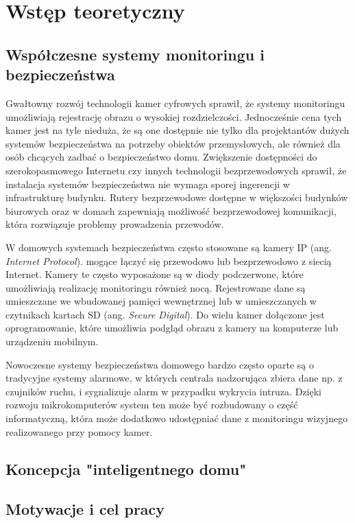 \documentclass[a4paper,11pt,twoside]{article}
\begin{document}
\tableofcontents
\setcounter{tocdepth}{2}
\newpage

\section{Wstęp teoretyczny}

\subsection{Współczesne systemy monitoringu i bezpieczeństwa}
Gwałtowny rozwój technologii kamer cyfrowych sprawił, że systemy monitoringu umożliwiają rejestrację obrazu o wysokiej rozdzielczości. Jednocześnie cena tych kamer jest na tyle nieduża, że są one dostępnie nie tylko dla projektantów dużych systemów bezpieczeństwa na potrzeby obiektów przemysłowych, ale również dla osób chcących zadbać o bezpieczeństwo domu. Zwiększenie dostępności do szerokopasmowego Internetu czy innych technologii bezprzewodowych sprawił, że  instalacja systemów bezpieczeństwa nie wymaga sporej ingerencji w infrastrukturę budynku. Rutery bezprzewodowe dostępne w większości budynków biurowych oraz w domach zapewniają możliwość bezprzewodowej komunikacji, która rozwiązuje problemy prowadzenia przewodów.

W domowych systemach bezpieczeństwa często stosowane są kamery IP (ang. \textit{Internet Protocol}). mogące łączyć się przewodowo lub bezprzewodowo z siecią Internet. Kamery te często wyposażone są w diody podczerwone, które umożliwiają realizację monitoringu również nocą. Rejestrowane dane są umieszczane we wbudowanej pamięci wewnętrznej lub w umieszczanych w czytnikach kartach SD (ang. \textit{Secure Digital}). Do wielu kamer dołączone jest oprogramowanie, które umożliwia podgląd obrazu z kamery na komputerze lub urządzeniu mobilnym.

Nowoczesne systemy bezpieczeństwa domowego bardzo często oparte są o tradycyjne systemy alarmowe, w których centrala nadzorująca zbiera dane np. z czujników ruchu, i sygnalizuje alarm w przypadku wykrycia intruza. Dzięki rozwoju mikrokomputerów system ten może być rozbudowany o część informatyczną, która może dodatkowo udostępniać dane z monitoringu wizyjnego realizowanego przy pomocy kamer\cite{monitoring}. 

\subsection{Koncepcja "inteligentnego domu"}


\subsection{Motywacje i cel pracy}
\end{document}
